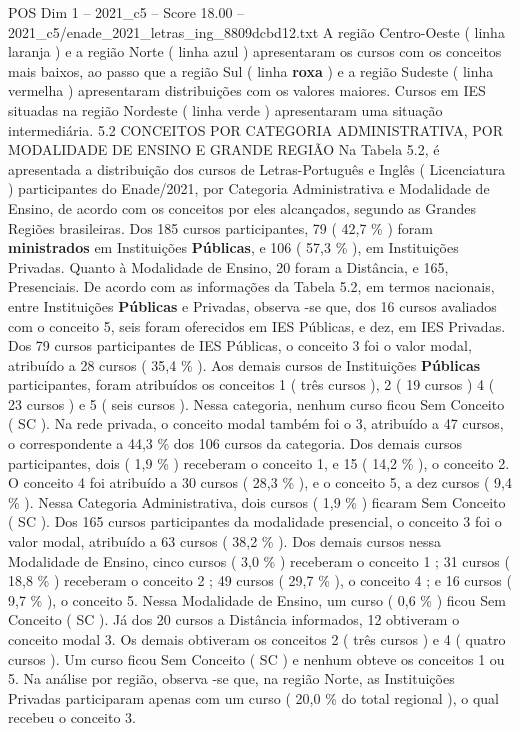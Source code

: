\begin{textsample}{POS Dim 1 – 2021\_c5 – Score 18.00 – 2021\_c5/enade\_2021\_letras\_ing\_8809dcbd12.txt}
A região Centro-Oeste ( linha laranja ) e a região Norte ( linha azul ) apresentaram os cursos com os conceitos mais baixos, ao passo que a região Sul ( linha \textbf{roxa} ) e a região Sudeste ( linha vermelha ) apresentaram distribuições com os valores maiores.
Cursos em IES situadas na região Nordeste ( linha verde ) apresentaram uma situação intermediária. 5.2 CONCEITOS POR CATEGORIA ADMINISTRATIVA, POR MODALIDADE DE ENSINO E GRANDE REGIÃO Na Tabela 5.2, é apresentada a distribuição dos cursos de Letras-Português e Inglês ( Licenciatura ) participantes do Enade/2021, por Categoria Administrativa e Modalidade de Ensino, de acordo com os conceitos por eles alcançados, segundo as Grandes Regiões brasileiras.
Dos 185 cursos participantes, 79 ( 42,7 \% ) foram \textbf{ministrados} em Instituições \textbf{Públicas}, e 106 ( 57,3 \% ), em Instituições Privadas.
Quanto à Modalidade de Ensino, 20 foram a Distância, e 165, Presenciais.
De acordo com as informações da Tabela 5.2, em termos nacionais, entre Instituições \textbf{Públicas} e Privadas, observa -se que, dos 16 cursos avaliados com o conceito 5, seis foram oferecidos em IES Públicas, e dez, em IES Privadas.
Dos 79 cursos participantes de IES Públicas, o conceito 3 foi o valor modal, atribuído a 28 cursos ( 35,4 \% ).
Aos demais cursos de Instituições \textbf{Públicas} participantes, foram atribuídos os conceitos 1 ( três cursos ), 2 ( 19 cursos ) 4 ( 23 cursos ) e 5 ( seis cursos ).
Nessa categoria, nenhum curso ficou Sem Conceito ( SC ).
Na rede privada, o conceito modal também foi o 3, atribuído a 47 cursos, o correspondente a 44,3 \% dos 106 cursos da categoria.
Dos demais cursos participantes, dois ( 1,9 \% ) receberam o conceito 1, e 15 ( 14,2 \% ), o conceito 2.
O conceito 4 foi atribuído a 30 cursos ( 28,3 \% ), e o conceito 5, a dez cursos ( 9,4 \% ).
Nessa Categoria Administrativa, dois cursos ( 1,9 \% ) ficaram Sem Conceito ( SC ).
Dos 165 cursos participantes da modalidade presencial, o conceito 3 foi o valor modal, atribuído a 63 cursos ( 38,2 \% ).
Dos demais cursos nessa Modalidade de Ensino, cinco cursos ( 3,0 \% ) receberam o conceito 1 ; 31 cursos ( 18,8 \% ) receberam o conceito 2 ; 49 cursos ( 29,7 \% ), o conceito 4 ; e 16 cursos ( 9,7 \% ), o conceito 5.
Nessa Modalidade de Ensino, um curso ( 0,6 \% ) ficou Sem Conceito ( SC ).
Já dos 20 cursos a Distância informados, 12 obtiveram o conceito modal 3.
Os demais obtiveram os conceitos 2 ( três cursos ) e 4 ( quatro cursos ).
Um curso ficou Sem Conceito ( SC ) e nenhum obteve os conceitos 1 ou 5.
Na análise por região, observa -se que, na região Norte, as Instituições Privadas participaram apenas com um curso ( 20,0 \% do total regional ), o qual recebeu o conceito 3.

\end{textsample}
